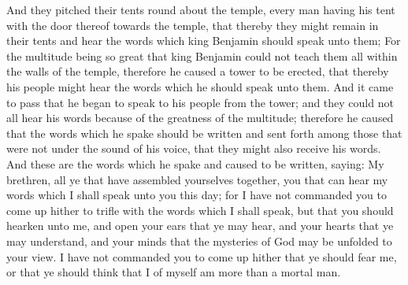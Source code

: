 And they pitched their tents round about the temple, every man having his tent with the door thereof towards the temple, that thereby they might remain in their tents and hear the words which king Benjamin should speak unto them;
\bverse \iffalse For the multitude being so great that king Benjamin could not teach them all within the walls of the temple, therefore he caused a tower to be erected, that thereby his people might hear the words which he should speak unto them. \fi
For the multitude being so great that king Benjamin could not teach them all within the walls of the temple, therefore he caused a tower to be erected, that thereby his people might hear the words which he should speak unto them.
\bverse \iffalse And it came to pass that he began to speak to his people from the tower; and they could not all hear his words because of the greatness of the multitude; therefore he caused that the words which he spake should be written and sent forth among those that were not under the sound of his voice, that they might also receive his words. \fi
And it came to pass that he began to speak to his people from the tower; and they could not all hear his words because of the greatness of the multitude; therefore he caused that the words which he spake should be written and sent forth among those that were not under the sound of his voice, that they might also receive his words.
\bverse \iffalse And these are the words which he spake and caused to be written, saying: My brethren, all ye that have assembled yourselves together, you that can hear my words which I shall speak unto you this day; for I have not commanded you to come up hither to trifle with the words which I shall speak, but that you should hearken unto me, and open your ears that ye may hear, and your hearts that ye may understand, and your minds that the mysteries of God may be unfolded to your view. \fi
And these are the words which he spake and caused to be written, saying: My brethren, all ye that have assembled yourselves together, you that can hear my words which I shall speak unto you this day; for I have not commanded you to come up hither to trifle with the words which I shall speak, but that you should hearken unto me, and open your ears that ye may hear, and your hearts that ye may understand, and your minds that the mysteries of God may be unfolded to your view.
\bverse \iffalse I have not commanded you to come up hither that ye should fear me, or that ye should think that I of myself am more than a mortal man. \fi
I have not commanded you to come up hither that ye should fear me, or that ye should think that I of myself am more than a mortal man.
